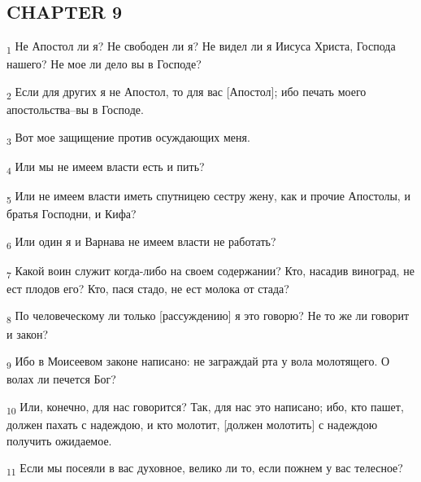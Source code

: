 \subsection{CHAPTER 9}
\begin{tcolorbox}
\textsubscript{1} Не Апостол ли я? Не свободен ли я? Не видел ли я Иисуса Христа, Господа нашего? Не мое ли дело вы в Господе?
\end{tcolorbox}
\begin{tcolorbox}
\textsubscript{2} Если для других я не Апостол, то для вас [Апостол]; ибо печать моего апостольства--вы в Господе.
\end{tcolorbox}
\begin{tcolorbox}
\textsubscript{3} Вот мое защищение против осуждающих меня.
\end{tcolorbox}
\begin{tcolorbox}
\textsubscript{4} Или мы не имеем власти есть и пить?
\end{tcolorbox}
\begin{tcolorbox}
\textsubscript{5} Или не имеем власти иметь спутницею сестру жену, как и прочие Апостолы, и братья Господни, и Кифа?
\end{tcolorbox}
\begin{tcolorbox}
\textsubscript{6} Или один я и Варнава не имеем власти не работать?
\end{tcolorbox}
\begin{tcolorbox}
\textsubscript{7} Какой воин служит когда-либо на своем содержании? Кто, насадив виноград, не ест плодов его? Кто, пася стадо, не ест молока от стада?
\end{tcolorbox}
\begin{tcolorbox}
\textsubscript{8} По человеческому ли только [рассуждению] я это говорю? Не то же ли говорит и закон?
\end{tcolorbox}
\begin{tcolorbox}
\textsubscript{9} Ибо в Моисеевом законе написано: не заграждай рта у вола молотящего. О волах ли печется Бог?
\end{tcolorbox}
\begin{tcolorbox}
\textsubscript{10} Или, конечно, для нас говорится? Так, для нас это написано; ибо, кто пашет, должен пахать с надеждою, и кто молотит, [должен молотить] с надеждою получить ожидаемое.
\end{tcolorbox}
\begin{tcolorbox}
\textsubscript{11} Если мы посеяли в вас духовное, велико ли то, если пожнем у вас телесное?
\end{tcolorbox}
